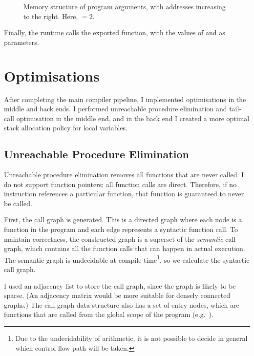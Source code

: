 \documentclass[00-main.tex]{subfiles}
\begin{document}
\begin{figure}[t]
  \centering
  \caption{Memory structure of program arguments, with addresses increasing to the right. Here, ${} = 2$.}
  \label{fig:program args memory structure} %
\end{figure}

Finally, the runtime calls the exported  function, with the values of  and  as parameters.

\section{Optimisations}\label{sec:impl:optimisations}

After completing the main compiler pipeline, I implemented optimisations in the middle and back ends.
I performed unreachable procedure elimination and tail-call optimisation in the middle end, and in the back end I created a more optimal stack allocation policy for local variables.

\subsection{Unreachable Procedure Elimination}\label{sec:impl:unreachable procedure elimination}

Unreachable procedure elimination removes all functions that are never called.
I do not support function pointers; all function calls are direct.
Therefore, if no  instruction references a particular function, that function is guaranteed to never be called.

First, the call graph is generated.
This is a directed graph where each node is a function in the program and each edge represents a syntactic function call.
To maintain correctness, the constructed graph is a superset of the \emph{semantic} call graph, which contains all the function calls that can happen in actual execution.
The semantic graph is undecidable at compile time\footnote{Due to the undecidability of arithmetic, it is not possible to decide in general which control flow path will be taken.}, so we calculate the syntactic call graph.

I used an adjacency list to store the call graph, since the graph is likely to be sparse.
(An adjacency matrix would be more suitable for densely connected graphs.)
The call graph data structure also has a set of entry nodes, which are functions that are called from the global scope of the program (e.g.~). %
\end{document}
